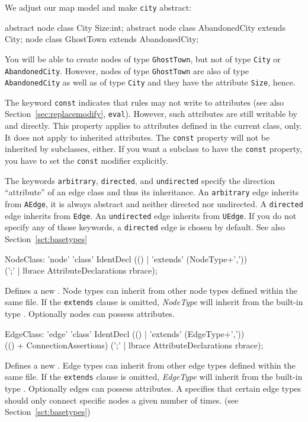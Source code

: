 \begin{example}
We adjust our map model and make \texttt{city} abstract:
\begin{grgen}
abstract node class City {
  Size:int;
}
abstract node class AbandonedCity extends City;
node class GhostTown extends AbandonedCity;
\end{grgen}
You will be able to create nodes of type \texttt{GhostTown}, but not of type \texttt{City} or \texttt{AbandonedCity}. However, nodes of type \texttt{GhostTown} are also of type \texttt{AbandonedCity} as well as of type \texttt{City} and they have the attribute \texttt{Size}, hence.
\end{example}
The keyword \texttt{const} indicates that rules may not write to attributes (see also Section~\ref{sec:replacemodify}, \texttt{eval}). However, such attributes are still writable by \LibGr{} and \GrShell{} directly. This property applies to attributes defined in the current class, only. It does not apply to inherited attributes. The \texttt{const} property will not be inherited by subclasses, either. If you want a subclass to have the \texttt{const} property, you have to set the \texttt{const} modifier explicitly.

The keywords \texttt{arbitrary}, \texttt{directed}, and \texttt{undirected} specify the direction ``attribute'' of an edge class and thus its inheritance.
An \texttt{arbitrary} edge inherits from \texttt{AEdge}, it is always abstract and neither directed nor undirected.
A \texttt{directed} edge inherits from \texttt{Edge}.
An \texttt{undirected} edge inherits from \texttt{UEdge}.
If you do not specify any of those keywords, a \texttt{directed} edge is chosen by default.
See also Section~\ref{sct:basetypes}

\begin{rail}
  NodeClass: 'node' 'class' IdentDecl (() | 'extends' (NodeType+',')) \\
    (';' | lbrace AttributeDeclarations rbrace);
\end{rail}
Defines a new . Node types can inherit from other node types defined within the same file. If the \texttt{extends} clause is omitted, \emph{NodeType} will inherit from the built-in type \texttt{}. Optionally nodes can possess attributes.

\begin{rail}
  EdgeClass: 'edge' 'class' IdentDecl (() | 'extends' (EdgeType+',')) \\
    (() + ConnectionAssertions) (';' | lbrace AttributeDeclarations rbrace);
\end{rail}
Defines a new .
Edge types can inherit from other edge types defined within the same file.
If the \texttt{extends} clause is omitted, \emph{EdgeType} will inherit from the built-in type \texttt{}.
Optionally edges can possess attributes.
A  specifies that certain edge types should only connect specific nodes a given number of times.
(see Section~\ref{sct:basetypes})

